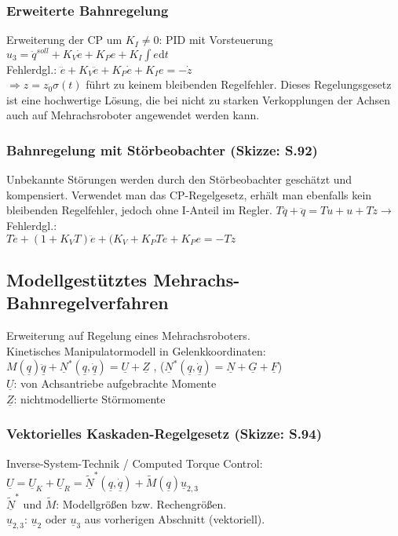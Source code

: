 \documentclass[a4paper,landscape,6pt]{article}
\newcommand{\ul}[1]{\underline{#1}}
\begin{document}
\begin{multicols}{3}
\subsubsection*{Erweiterte Bahnregelung}
Erweiterung der CP um $K_I \neq 0$: PID mit Vorsteuerung\\
$\boxed{u_3 = \ddot q^{soll} + K_V \dot e + K_P e + K_I \int e \mathrm{d}t }$\\
Fehlerdgl.: $\dddot e + K_V \ddot e + K_P \dot e + K_I e = - \dot z$\\
$\Rightarrow z=z_0\sigma(t)$ führt zu keinem bleibenden Regelfehler. Dieses Regelungsgesetz ist eine hochwertige Lösung, die bei nicht zu starken Verkopplungen der Achsen auch auf Mehrachsroboter angewendet werden kann.
\subsubsection*{Bahnregelung mit Störbeobachter \footnotesize{(Skizze: S.92)}}
Unbekannte Störungen werden durch den Störbeobachter geschätzt und kompensiert. Verwendet man das CP-Regelgesetz, erhält man ebenfalls kein bleibenden Regelfehler, jedoch ohne I-Anteil im Regler.
$T\dddot q + \ddot q = T \dot u + u + T \dot z \longrightarrow$ Fehlerdgl.:\\ $T \dddot e + (1+K_V T) \ddot e + (K_V + K_P T \dot e + K_P e = - T \dot z$
\subsection*{Modellgestütztes Mehrachs-Bahnregelverfahren}
Erweiterung auf Regelung eines Mehrachsroboters.\\
Kinetisches Manipulatormodell in Gelenkkoordinaten:\\
$M(\ul q) \ddot{\ul q} + \ul N^*(\ul q, \dot{\ul q}) = \ul U + \ul Z$ , ($\ul N^*(\ul q, \dot{\ul q}) = \ul N + \ul G + \ul F$)\\
$\ul U$: von Achsantriebe aufgebrachte Momente\\
$\ul Z$: nichtmodellierte Störmomente
\subsubsection*{Vektorielles Kaskaden-Regelgesetz \footnotesize{(Skizze: S.94)}}
Inverse-System-Technik / Computed Torque Control:\\
$\boxed{\ul U = \ul U_K + \ul U_R = \tilde{\ul N}^*(\ul q, \dot{\ul q}) + \tilde M(\ul q) \ul u_{2,3}}$\\
$\tilde{\ul N}^*$ und $\tilde M$: Modellgrößen bzw. Rechengrößen.\\ 
$\ul u_{2,3}$: $\ul u_2$ oder $\ul u_3$ aus vorherigen Abschnitt (vektoriell).\\


\end{multicols}
\end{document}
